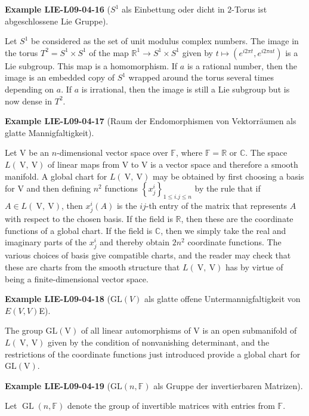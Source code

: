 \documentclass[10pt, letterpaper]{article}
\newcommand{\GL}{\mathrm{GL}}
\newcommand{\CustomHeading}[3]{%
  \par\medskip\noindent%
  \textbf{#1 #2} \textnormal{(#3)}.\enskip%
}
\newenvironment{EXA}[2]{\CustomHeading{Example}{#1}{#2}}{}
\begin{document}
\begin{EXA}{LIE-L09-04-16}{$S^1$ als Einbettung oder dicht in $2$-Torus ist abgeschlossene Lie Gruppe}
Let $S^{1}$ be considered as the set of unit modulus complex numbers. The image in the torus $T^{2}=S^{1} \times S^{1}$ of the map $\mathbb{R}^{1} \rightarrow S^{1} \times S^{1}$ given by $t \mapsto\left(e^{i 2 \pi t}, e^{i 2 \pi a t}\right)$ is a Lie subgroup. This map is a homomorphism. If $a$ is a rational number, then the image is an embedded copy of $S^{1}$ wrapped around the torus several times depending on $a$. If $a$ is irrational, then the image is still a Lie subgroup but is now dense in $T^{2}$.
\end{EXA}

\begin{EXA}{LIE-L09-04-17}{Raum der Endomorphismen von Vektorräumen als glatte Mannigfaltigkeit}
Let V be an $n$-dimensional vector space over $\mathbb{F}$, where $\mathbb{F}=\mathbb{R}$ or $\mathbb{C}$. The space $L(\mathrm{~V}, \mathrm{~V})$ of linear maps from V to V is a vector space and therefore a smooth manifold. A global chart for $L(\mathrm{~V}, \mathrm{~V})$ may be obtained by first choosing a basis for V and then defining $n^{2}$ functions $\left\{x_{j}^{i}\right\}_{1 \leq i . j \leq n}$ by the rule that if $A \in L(\mathrm{~V}, \mathrm{~V})$, then $x_{j}^{i}(A)$ is the $i j$-th entry of the matrix that represents $A$ with respect to the chosen basis. If the field is $\mathbb{R}$, then these are the coordinate functions of a global chart. If the field is $\mathbb{C}$, then we simply take the real and imaginary parts of the $x_{j}^{i}$ and thereby obtain $2 n^{2}$ coordinate functions. The various choices of basis give compatible charts, and the reader may check that these are charts from the smooth structure that $L(\mathrm{~V}, \mathrm{~V})$ has by virtue of being a finite-dimensional vector space.
\end{EXA}

\begin{EXA}{LIE-L09-04-18}{$\GL(V)$ als glatte offene Untermannigfaltigkeit von $E(V,V)$E}
The group $\mathrm{GL}(\mathrm{V})$ of all linear automorphisms of V is an open submanifold of $L(\mathrm{~V}, \mathrm{~V})$ given by the condition of nonvanishing determinant, and the restrictions of the coordinate functions just introduced provide a global chart for $\mathrm{GL}(\mathrm{V})$.
\end{EXA}

\begin{EXA}{LIE-L09-04-19}{$\GL(n,\mathbb{F})$ als Gruppe der invertierbaren Matrizen}
Let $\operatorname{GL}(n, \mathbb{F})$ denote the group of invertible matrices with entries from $\mathbb{F}$.
\end{EXA}
\end{document}

